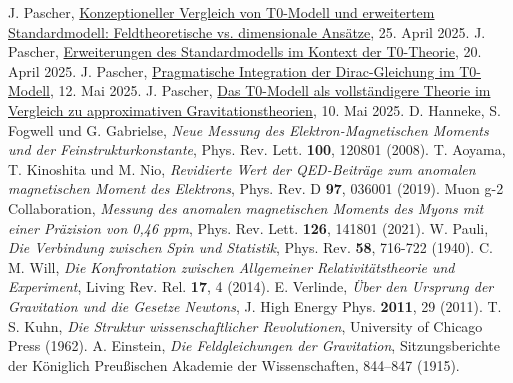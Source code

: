 \documentclass[12pt,a4paper]{article}
\begin{document}
\begin{thebibliography}{99}
		 J. Pascher, \href{https://github.com/jpascher/T0-Time-Mass-Duality/tree/main/2/pdf/Deutsch/T0vsESM_ConceptualAnalysis.pdf}{Konzeptioneller Vergleich von T0-Modell und erweitertem Standardmodell: Feldtheoretische vs. dimensionale Ansätze}, 25. April 2025.
		 J. Pascher, \href{https://github.com/jpascher/T0-Time-Mass-Duality/tree/main/2/pdf/Deutsch/StandardmodellErweiterungT0.pdf}{Erweiterungen des Standardmodells im Kontext der T0-Theorie}, 20. April 2025.
		 J. Pascher, \href{https://github.com/jpascher/T0-Time-Mass-Duality/tree/main/2/pdf/Deutsch/PragmatischeDiracT0.pdf}{Pragmatische Integration der Dirac-Gleichung im T0-Modell}, 12. Mai 2025.
		 J. Pascher, \href{https://github.com/jpascher/T0-Time-Mass-Duality/tree/main/2/pdf/Deutsch/T0-ModelAsCompleteTheory.pdf}{Das T0-Modell als vollständigere Theorie im Vergleich zu approximativen Gravitationstheorien}, 10. Mai 2025.
		 D. Hanneke, S. Fogwell und G. Gabrielse, \textit{Neue Messung des Elektron-Magnetischen Moments und der Feinstrukturkonstante}, Phys. Rev. Lett. \textbf{100}, 120801 (2008).
		 T. Aoyama, T. Kinoshita und M. Nio, \textit{Revidierte Wert der QED-Beiträge zum anomalen magnetischen Moment des Elektrons}, Phys. Rev. D \textbf{97}, 036001 (2019).
		 Muon g-2 Collaboration, \textit{Messung des anomalen magnetischen Moments des Myons mit einer Präzision von 0,46 ppm}, Phys. Rev. Lett. \textbf{126}, 141801 (2021).
		 W. Pauli, \textit{Die Verbindung zwischen Spin und Statistik}, Phys. Rev. \textbf{58}, 716-722 (1940).
		 C. M. Will, \textit{Die Konfrontation zwischen Allgemeiner Relativitätstheorie und Experiment}, Living Rev. Rel. \textbf{17}, 4 (2014).
		 E. Verlinde, \textit{Über den Ursprung der Gravitation und die Gesetze Newtons}, J. High Energy Phys. \textbf{2011}, 29 (2011).
		 T. S. Kuhn, \textit{Die Struktur wissenschaftlicher Revolutionen}, University of Chicago Press (1962).
		 A. Einstein, \textit{Die Feldgleichungen der Gravitation}, Sitzungsberichte der Königlich Preußischen Akademie der Wissenschaften, 844--847 (1915).
	\end{thebibliography}
	
\end{document}
